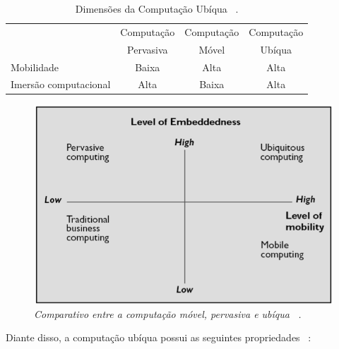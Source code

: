 		\begin{table} %
			\centering
			\caption{Dimensões da Computação Ubíqua ~\cite{passaro}.} %
			\begin{tabular}{l|c|c|c} 
				\hline %
				 & Computação & Computação & Computação \\
				 & Pervasiva & Móvel & Ubíqua \\ 
				\hline
				\hline
				Mobilidade & Baixa	 & Alta & Alta \\
				Imersão computacional & Alta & Baixa & Alta\\
				\hline
			\end{tabular}
			\label{tab:ubicomp}
		\end{table}
		
		\begin{figure}[h]
			\centering \includegraphics[scale=.45]{figuras/cap2/comparativoUbicomp.png}
			\caption {\textit{Comparativo entre a computação móvel, pervasiva e ubíqua ~\cite{almeida}.}}
			\label{fig:comparativoUbicomp} 
		\end{figure}
		
		Diante disso, a computação ubíqua possui as seguintes propriedades ~\cite{lins}: \\
		
